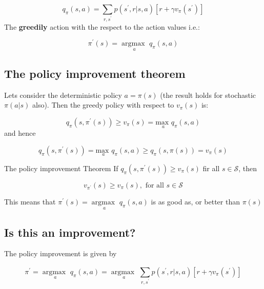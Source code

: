 	\begin{equation}
		q_\pi(s,a) = \sum_{r, s^{\prime}}^{} p(s^{\prime},r|s,a)[r + \gamma v_\pi(s^{\prime})]
	\end{equation}
The \textbf{greedily} action with the respect to the action values i.e.:

	\begin{equation}
		\pi^{\prime} (s) = \underset{a}{\arg \text{max }} q_\pi(s,a)
	\end{equation}
	
\subsection{The policy improvement theorem}
Lets consider the deterministic policy $a = \pi(s)$ (the result holds for stochastic $\pi (a|s)$ also). Then the greedy policy with respect to $v_\pi(s)$ is:

	\begin{equation}
		q_\pi(s, \pi^{\prime} (s)) \ge v_\pi(s) = \underset{a}{\text{max }} q_\pi(s,a)
	\end{equation}
and hence

	\begin{equation}
		q_\pi(s, \pi^{\prime}(s)) = \underset{a}{\text{max }}q_\pi(s,a) \ge q_\pi(s,\pi(s)) = v_\pi(s)
	\end{equation}

\begin{wbox}{The policy improvement Theorem}
If $q_\pi(s,\pi^{\prime}(s)) \ge v_\pi(s)$ fir all $s \in \mathcal{S}$, then

	\begin{equation}
		v_{\pi^{\prime}}(s) \ge v_\pi(s), \text{ for all } s \in \mathcal{S}
	\end{equation} 
\end{wbox}


This means that $\pi^{\prime}(s) = \underset{a}{\arg \text{max }} q_\pi(s,a)$ is as good as, or better than $\pi(s)$


\subsection{Is this an improvement?}
The policy improvement is given by

	\begin{equation}
		\pi^{\prime} = \underset{a}{\arg \text{max }} q_\pi(s,a) = \underset{a}{\arg \text{max }}\sum_{r, s^{\prime}}^{} p(s^{\prime},r|s,a)[r + \gamma v_\pi(s^{\prime})]
	\end{equation}

